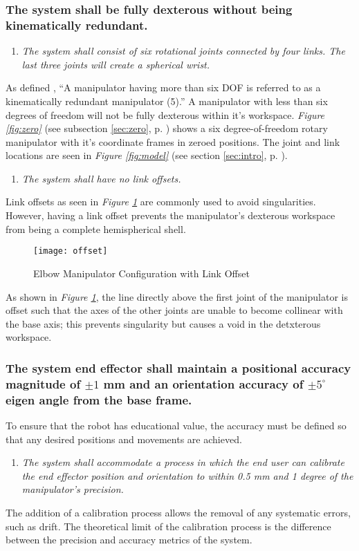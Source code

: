 \subsubsection{The system shall be fully dexterous without being kinematically redundant.}
\begin{enumerate}
\item \textit{The system shall consist of six rotational joints connected by four links. The last three joints will create a spherical wrist.}
\end{enumerate}
As defined \cite{robo}, “A manipulator having more than six DOF is referred to as a kinematically redundant manipulator (5).” A manipulator with less than six degrees of freedom will not be fully dexterous within it's workspace. \emph{Figure \ref{fig:zero}} (see subsection \ref{sec:zero}, p. \pageref{fig:zero}) shows a six degree-of-freedom rotary manipulator with it's coordinate frames in zeroed positions. The joint and link locations are seen in \emph{Figure \ref{fig:model}} (see section \ref{sec:intro}, p. \pageref{sec:intro}).
\begin{enumerate}[resume]
\item \textit{The system shall have no link offsets.}
\end{enumerate}
Link offsets as seen in \emph{Figure \ref{fig:offset}} are commonly used to avoid singularities. However, having a link offset prevents the manipulator's dexterous workspace from being a complete hemispherical shell.

\begin{figure}[htp]
  \centering
  \texttt{[image: offset]}
  \caption[Elbow Manipulator Configuration with Link Offset]{Elbow Manipulator Configuration with Link Offset \cite{robo}}
  \label{fig:offset}
\end{figure}
As shown in \emph{Figure \ref{fig:offset}}, the line directly above the first joint of the manipulator is offset such that the axes of the other joints are unable to become collinear with the base axis; this prevents singularity but causes a void in the detxterous workspace.
\subsubsection{The system end effector shall maintain a positional accuracy magnitude of \(\pm 1\) mm and an orientation accuracy of \(\pm 5^{\circ}\) eigen angle from the base frame.}
To ensure that the robot has educational value, the accuracy must be defined so that any desired positions and movements are achieved.
\begin{enumerate}
  \item \textit{The system shall accommodate a process in which the end user can calibrate the end effector position and orientation to within 0.5 mm and 1 degree of the manipulator’s precision.}
\end{enumerate}
The addition of a calibration process allows the removal of any systematic errors, such as drift. The theoretical limit of the calibration process is the difference between the precision and accuracy metrics of the system.
